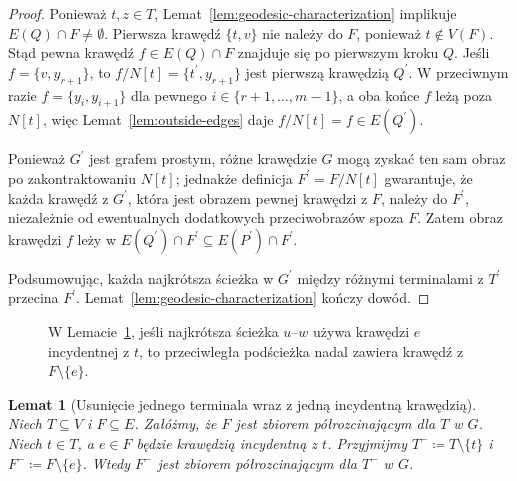 \documentclass[11pt,a4paper]{amsart}
\theoremstyle{definition}
\theoremstyle{plain}
\newtheorem{lemma}[definition]{Lemat}
\begin{document}
\begin{proof}
Ponieważ $t,z\in T$, Lemat~\ref{lem:geodesic-characterization} implikuje $E(Q)\cap F\neq\emptyset$. Pierwsza krawędź $\{t,v\}$ nie należy do $F$, ponieważ $t\notin V(F)$. Stąd pewna krawędź $f\in E(Q)\cap F$ znajduje się po pierwszym kroku $Q$. Jeśli $f=\{v,y_{r+1}\}$, to $f/N[t]=\{t^\prime,y_{r+1}\}$ jest pierwszą krawędzią $Q^\prime$. W przeciwnym razie $f=\{y_i,y_{i+1}\}$ dla pewnego $i\in\{r+1,\dots,m-1\}$, a oba końce $f$ leżą poza $N[t]$, więc Lemat~\ref{lem:outside-edges} daje $f/N[t]=f\in E(Q^\prime)$.

Ponieważ $G^\prime$ jest grafem prostym, różne krawędzie $G$ mogą zyskać ten sam obraz po zakontraktowaniu $N[t]$; jednakże definicja $F^\prime=F/N[t]$ gwarantuje, że każda krawędź z $G^\prime$, która jest obrazem pewnej krawędzi z $F$, należy do $F^\prime$, niezależnie od ewentualnych dodatkowych przeciwobrazów spoza $F$. Zatem obraz krawędzi $f$ leży w $E(Q^\prime)\cap F^\prime\subseteq E(P^\prime)\cap F^\prime$.

Podsumowując, każda najkrótsza ścieżka w $G^\prime$ między różnymi terminalami z $T^\prime$ przecina $F^\prime$. Lemat~\ref{lem:geodesic-characterization} kończy dowód.
\end{proof}

\begin{figure}[t]
\centering
{}
\caption{W Lemacie~\ref{lem:terminal-deletion}, jeśli najkrótsza ścieżka $u$--$w$ używa krawędzi $e$ incydentnej z $t$, to przeciwległa podścieżka nadal zawiera krawędź z $F\setminus\{e\}$.}
\label{fig:split-path}
\end{figure}

\begin{lemma}[Usunięcie jednego terminala wraz z jedną incydentną krawędzią]\label{lem:terminal-deletion}
Niech $T\subseteq V$ i $F\subseteq E$. Załóżmy, że $F$ jest zbiorem półrozcinającym dla $T$ w $G$. Niech $t\in T$, a $e\in F$ będzie krawędzią incydentną z $t$. Przyjmijmy $T^-\coloneqq T\setminus\{t\}$ i $F^-\coloneqq F\setminus\{e\}$. Wtedy $F^-$ jest zbiorem półrozcinającym dla $T^-$ w $G$.
\end{lemma}
\end{document}
